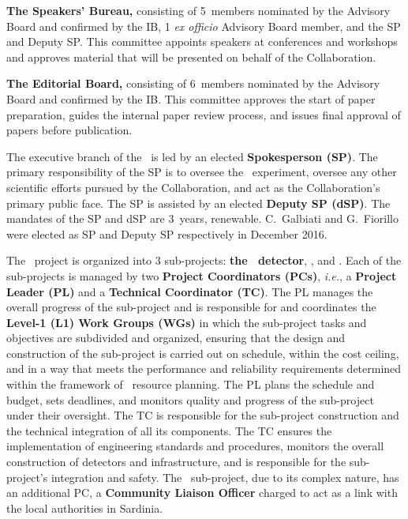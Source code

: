 \begin{compactenum}
\item[\bf The Speakers' Bureau,] consisting of \num{5}~members nominated by the Advisory Board and confirmed by the IB, \num{1} {\it ex officio} Advisory Board member, and the SP and Deputy SP.  This committee appoints speakers at conferences and workshops and approves material that will be presented on behalf of the Collaboration.
\item[\bf The Editorial Board,] consisting of \num{6}~members nominated by the Advisory Board and confirmed by the IB.  This committee approves the start of paper preparation, guides the internal paper review process, and issues final approval of papers before publication.
\end{compactenum}

The executive branch of the \GADMC\ is led by an elected {\bf Spokesperson (SP)}.  The primary responsibility of the SP is to oversee the \DSks\ experiment, oversee any other scientific efforts pursued by the Collaboration, and act as the Collaboration's primary public face.  The SP is assisted by an elected {\bf Deputy SP (dSP)}.  The mandates of the SP and dSP are \num{3}~years, renewable.  C.~Galbiati and G.~Fiorillo were elected as SP and Deputy SP respectively in December 2016.

The \DSk\ project is organized into \num{3} sub-projects: {\bf the \DSks\ detector}, {\bf \Urania}, and {\bf \Aria}. Each of the sub-projects is managed by two {\bf Project Coordinators (PCs)}, {\it i.e.}, a {\bf Project Leader (PL)} and a {\bf Technical Coordinator (TC)}.  The PL manages the overall progress of the sub-project and is responsible for and coordinates the {\bf Level-1 (L1) Work Groups (WGs)} in which the sub-project tasks and objectives are subdivided and organized, ensuring that the design and construction of the sub-project is carried out on schedule, within the cost ceiling, and in a way that meets the performance and reliability requirements determined within the framework of \GADMC\ resource planning.  The PL plans the schedule and budget, sets deadlines, and monitors quality and progress of the sub-project under their oversight.  The TC is responsible for the sub-project construction and the technical integration of all its components. The TC ensures the implementation of engineering standards and procedures, monitors the overall construction of detectors and infrastructure, and is responsible for the sub-project's integration and safety. The \Aria\ sub-project, due to its complex nature, has an additional PC, a {\bf Community Liaison Officer} charged to act as a link with the local authorities in Sardinia.

